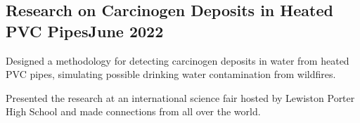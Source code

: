 \documentclass[a4paper, 12pt]{article}
\begin{document}
\subsection {{Research on Carcinogen Deposits in Heated PVC Pipes}\hfill June 2022}
\begin{zitemize}
\item Designed a methodology for detecting carcinogen deposits in water from heated PVC pipes, simulating possible drinking water contamination from wildfires.  
\item Presented the research at an international science fair hosted by Lewiston Porter High School and made connections from all over the world. 
\end{zitemize}
\end{document}
